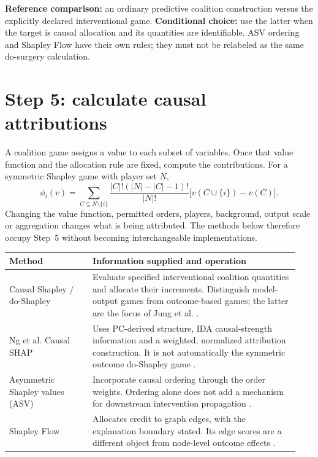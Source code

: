 \documentclass[11pt,letterpaper]{article}
\begin{document}
\textbf{Reference comparison:} an ordinary predictive coalition construction versus the explicitly declared interventional game. \textbf{Conditional choice:} use the latter when the target is causal allocation and its quantities are identifiable. ASV ordering and Shapley Flow have their own rules; they must not be relabeled as the same do-surgery calculation.

\clearpage
\section*{Step 5: calculate causal attributions}

A coalition game assigns a value to each subset of variables. Once that value function and the allocation rule are fixed, compute the contributions. For a symmetric Shapley game with player set $N$,
\[
 \phi_i(v)=\sum_{C\subseteq N\setminus\{i\}}
 \frac{|C|!(|N|-|C|-1)!}{|N|!}
 \bigl[v(C\cup\{i\})-v(C)\bigr].
\]
Changing the value function, permitted orders, players, background, output scale or aggregation changes what is being attributed. The methods below therefore occupy Step~5 without becoming interchangeable implementations.

\begingroup\small\setlength{\tabcolsep}{5pt}
\begin{longtable}{@{}L{0.27\linewidth}L{0.67\linewidth}@{}}
\toprule Method & Information supplied and operation\\\midrule\endhead
Causal Shapley / do-Shapley & Evaluate specified interventional coalition quantities and allocate their increments. Distinguish model-output games from outcome-based games; the latter are the focus of Jung et al. \citep{Heskes2020,Jung2022}.\\[5pt]
Ng et al. Causal SHAP & Uses PC-derived structure, IDA causal-strength information and a weighted, normalized attribution construction. It is not automatically the symmetric outcome do-Shapley game \citep{Ng2025}.\\[5pt]
Asymmetric Shapley values (ASV) & Incorporate causal ordering through the order weights. Ordering alone does not add a mechanism for downstream intervention propagation \citep{Frye2020}.\\[5pt]
Shapley Flow & Allocates credit to graph edges, with the explanation boundary stated. Its edge scores are a different object from node-level outcome effects \citep{Wang2021}.\\
\bottomrule
\end{longtable}\endgroup
\end{document}
